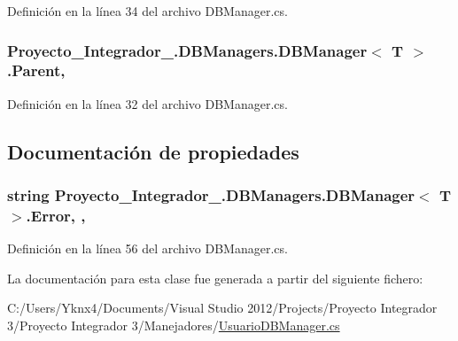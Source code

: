 Definición en la línea 34 del archivo D\-B\-Manager.\-cs.

\hypertarget{class_proyecto___integrador__3_1_1_d_b_managers_1_1_d_b_manager_3_01_t_01_4_a06315e75298c8f2fd46f32dc7c9a80b2}{
\subsubsection[{Parent}]{ Proyecto\-\_\-\-Integrador\-\_.\-D\-B\-Managers.\-D\-B\-Manager$<$ T $>$.Parent\hspace{0.3cm}{\ttfamily [protected]}, {\ttfamily [inherited]}}}\label{class_proyecto___integrador__3_1_1_d_b_managers_1_1_d_b_manager_3_01_t_01_4_a06315e75298c8f2fd46f32dc7c9a80b2}


Definición en la línea 32 del archivo D\-B\-Manager.\-cs.



\subsection{Documentación de propiedades}
\hypertarget{class_proyecto___integrador__3_1_1_d_b_managers_1_1_d_b_manager_3_01_t_01_4_a6e5caaed2ee1a4d067dfbf5aaa1b1fa8}{
\subsubsection[{Error}]{\setlength{\rightskip}{0pt plus 5cm}string Proyecto\-\_\-\-Integrador\-\_.\-D\-B\-Managers.\-D\-B\-Manager$<$ T $>$.Error\hspace{0.3cm}{\ttfamily [get]}, {\ttfamily [set]}, {\ttfamily [inherited]}}}\label{class_proyecto___integrador__3_1_1_d_b_managers_1_1_d_b_manager_3_01_t_01_4_a6e5caaed2ee1a4d067dfbf5aaa1b1fa8}


Definición en la línea 56 del archivo D\-B\-Manager.\-cs.



La documentación para esta clase fue generada a partir del siguiente fichero\-:\begin{DoxyCompactItemize}
\item 
C\-:/\-Users/\-Yknx4/\-Documents/\-Visual Studio 2012/\-Projects/\-Proyecto Integrador 3/\-Proyecto Integrador 3/\-Manejadores/\hyperlink{_usuario_d_b_manager_8cs}{Usuario\-D\-B\-Manager.\-cs}\end{DoxyCompactItemize}
